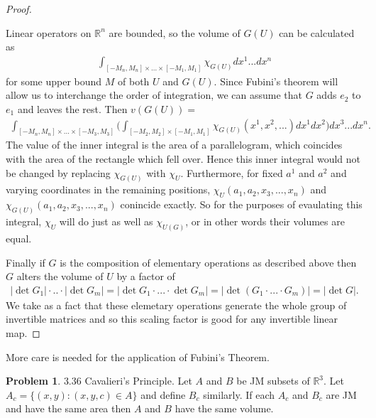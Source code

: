 \documentclass[20pt]{article}
\theoremstyle{plain}
\theoremstyle{definition}
\newtheorem*{problem}{Problem}
\newcommand{\reals}{\mathbb{R}}
\begin{document}
\begin{proof}
\begin{enumerate}
     Linear operators on $\mathbb{R}^n$ are bounded, so the volume of $G(U)$
     can be calculated as 
     \begin{align*}
       \int_{[-M_n, M_n]\times...\times [-M_1,M_1]}\chi_{G(U)}dx^1...dx^n
     \end{align*}
     for some upper bound $M$ of both $U$ and $G(U)$.  Since Fubini's theorem will allow us to interchange
     the order of integration, we can assume that $G$ 
     adds $e_2$ to $e_1$ and leaves the rest. Then $v(G(U)) = $
     \begin{align*}
       \int_{[-M_n, M_n]\times...\times[-M_3, M_3]} \bigg( 
          \int_{[-M_2,M_2]\times[-M_1,M_1]} \chi_{G(U)}(x^1, x^2, ...)dx^1dx^2
        \bigg) dx^3...dx^n.
     \end{align*}
     The value of the inner integral is the area of a parallelogram, which 
     coincides with the area of the rectangle which fell over.  Hence this inner integral 
     would not be changed by replacing $\chi_{G(U)}$ with $\chi_U.$
     Furthermore, for fixed $a^1$ and $a^2$ and varying coordinates in the 
     remaining positions, $\chi_U(a_1, a_2, x_3, ..., x_n)$ and 
     $\chi_{G(U)}(a_1, a_2, x_3, ..., x_n)$ conincide exactly.
     So for the purposes of evaulating this integral, $\chi_U$ will do 
     just as well as $\chi_{U(G)}$, or in other words their volumes are equal.
     
     \end{enumerate}

     Finally if $G$ is the composition of elementary operations as described above
     then $G$ alters the volume of $U$ by a factor of 
     \begin{align*}
        |\det G_1| \cdot .. \cdot |\det G_m| = 
        |\det G_1 \cdot ... \cdot \det G_m | = 
        |\det (G_1 \cdot ... \cdot G_m) | = |\det G|.
     \end{align*}
     We take as a fact that these elemetary operations generate the whole group 
     of invertible matrices and so this scaling factor is good for any invertible linear map.
\end{proof}
\color{Blue}
More care is needed for the application of Fubini's Theorem.
\color{Black}




\begin{problem}{3.36 Cavalieri's Principle.}
    Let $A$ and $B$ be JM subsets of $\reals^3$. 
    Let $A_c = \{(x, y): (x, y, c) \in A\}$ and define $B_c$ similarly.
    If each $A_c$ and $B_c$ are JM  and have the same area then $A$ and $B$
    have the same volume.
\end{problem}
\end{document}
